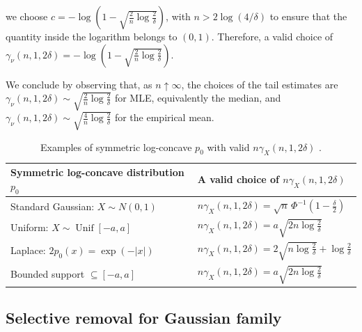 \begin{remark}
we choose $c = -\log\left(1-\sqrt{\frac{2}{n}\log\frac{2}{\delta}}\right)$, with \(n>2\log(4/\delta)\) to ensure that the quantity inside the logarithm
belongs to \((0,1)\). Therefore, a valid choice of $\gamma_{\nu}(n,1,2\delta)= -\log\left(1-\sqrt{\frac{2}{n}\log\frac{2}{\delta}}\right)$.


We conclude by observing that, as $n \uparrow \infty$, the choices of the tail estimates are $\gamma_{\nu}(n,1, 2\delta) \sim \sqrt{\frac{2}{n}\log\frac{2}{\delta}}$  for MLE, equivalently the median, and $\gamma_{\nu}(n,1, 2\delta) \sim \sqrt{\frac{4}{n}\log\frac{2}{\delta}}$ for the empirical mean.

\end{remark}

\begin{table}[t] \label{table:LMconstants}
\centering
\small
\setlength{\tabcolsep}{6pt}
\renewcommand{\arraystretch}{1.55}
\begin{tabularx}{\textwidth}{
@{}>{\raggedright\arraybackslash}p{}
>{\centering\arraybackslash}X@{}}
\toprule
Symmetric log-concave distribution \(p_0\)
&
A valid choice of \(n\gamma_X(n,1,2\delta)\)
\\
\midrule

Standard Gaussian: \(X\sim N(0,1)\)
&
\(n\displaystyle
    \gamma_X(n,1,2\delta)
    =
    \sqrt n\,\Phi^{-1}\!\left(1-\frac{\delta}{2}\right)
\)
\\

Uniform: \(X\sim \operatorname{Unif}[-a,a]\)
&
\(n\displaystyle
    \gamma_X(n,1,2\delta)
    =
    a\sqrt{2n\log\frac{2}{\delta}}
\)
\\

Laplace: \(2p_0(x)=\exp{(-|x|)}\)
&
\(n\displaystyle
    \gamma_X(n,1,2\delta)
    =
    2\sqrt{n\log\frac{2}{\delta}}
    +
    \log\frac{2}{\delta}
\)
\\

Bounded support \(\subseteq[-a,a]\)
&
\(\displaystyle
    n\gamma_X(n,1,2\delta)
    =
    a\sqrt{2n\log\frac{2}{\delta}}
\)
\\

\bottomrule
\end{tabularx}
\caption{Examples of symmetric log-concave  \(p_0\) with  valid \(n\gamma_X(n,1,2\delta)\) \citet{boucheron2013concentration}.}
\label{tab:symmetric-log-concave-tail-bounds}
\end{table}



\subsection{Selective removal for Gaussian family}


